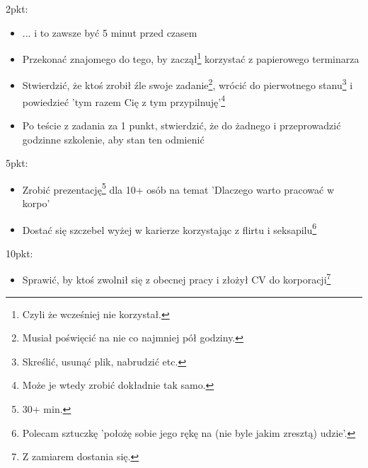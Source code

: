 \documentclass[11pt,a4paper,sans]{moderncv}        %
\begin{document}
2pkt:
\begin{itemize}
	\item ... i to zawsze być 5 minut przed czasem
	\item Przekonać znajomego do tego, by zaczął\footnote{Czyli że wcześniej nie korzystał.} korzystać z papierowego terminarza
	\item Stwierdzić, że ktoś zrobił źle swoje zadanie\footnote{Musiał poświęcić na nie co najmniej pół godziny.}, wrócić do
		pierwotnego stanu\footnote{Skreślić, usunąć plik, nabrudzić etc.} i powiedzieć 'tym razem Cię z tym
		przypilnuję'\footnote{Może je wtedy zrobić dokładnie tak samo.}
	\item Po teście z zadania za 1 punkt, stwierdzić, że do żadnego i przeprowadzić godzinne szkolenie, aby stan ten odmienić
\end{itemize}

5pkt:
\begin{itemize}
	\item Zrobić prezentację\footnote{30+ min.} dla 10+ osób na temat 'Dlaczego warto pracować w korpo'
	\item Dostać się szczebel wyżej w karierze korzystając z flirtu i seksapilu\footnote{Polecam sztuczkę 'położę sobie
		jego rękę na (nie byle jakim zresztą) udzie'.}
\end{itemize}

10pkt:
\begin{itemize}
	\item Sprawić, by ktoś zwolnił się z obecnej pracy i złożył CV do korporacji\footnote{Z zamiarem dostania się.}
\end{itemize}
\end{document}
